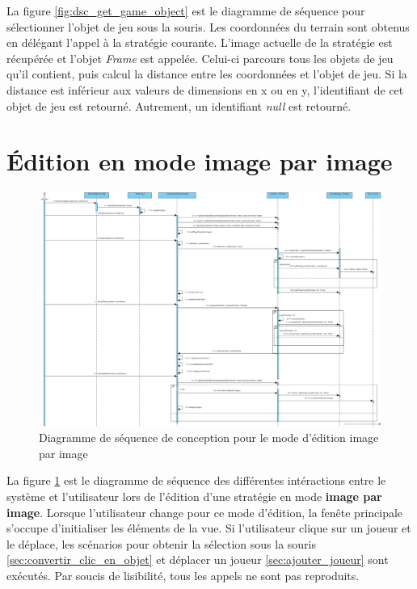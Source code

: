 La figure \ref{fig:dsc_get_game_object} est le diagramme de séquence pour sélectionner l'objet de jeu sous la souris.
Les coordonnées du terrain sont obtenus en délégant l'appel à la stratégie courante.
L'image actuelle de la stratégie est récupérée et l'objet \textit{Frame} est appelée.
Celui-ci parcours tous les objets de jeu qu'il contient, puis calcul la distance entre les coordonnées et l'objet de jeu.
Si la distance est inférieur aux valeurs de dimensions en x ou en y, l'identifiant de cet objet de jeu est retourné.
Autrement, un identifiant \textit{null} est retourné.

\section{Édition en mode image par image}
\label{sec:edition_image_par_image}

\begin{figure}[htpb]
    \centering
    \includegraphics[scale=0.3]{fig/dsc_edition_image_par_image.png}
    \caption{Diagramme de séquence de conception pour le mode d'édition image par image}
    \label{fig:dsc_edit_image}
\end{figure}

La figure \ref{fig:dsc_edit_image} est le diagramme de séquence des différentes intéractions entre le système et l'utilisateur lors de l'édition d'une stratégie en mode \textbf{image par image}.
Lorsque l'utilisateur change pour ce mode d'édition, la fenête principale s'occupe d'initialiser les éléments de la vue.
Si l'utilisateur clique sur un joueur et le déplace, les scénarios pour obtenir la sélection sous la souris \ref{sec:convertir_clic_en_objet} et déplacer un joueur \ref{sec:ajouter_joueur} sont exécutés.
Par soucis de lisibilité, tous les appels ne sont pas reproduits.

